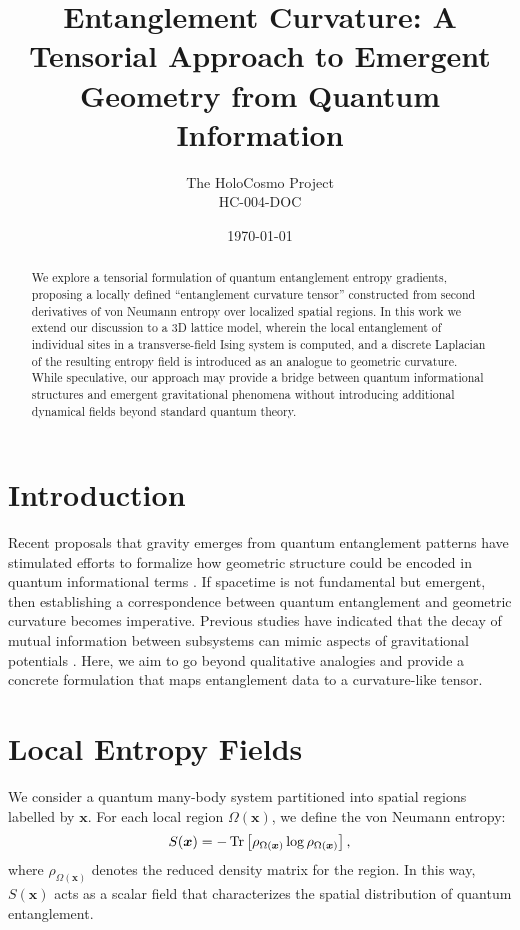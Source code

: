 \documentclass[12pt]{article}
\title{Entanglement Curvature: A Tensorial Approach to Emergent Geometry from Quantum Information}
\author{The HoloCosmo Project\\HC-004-DOC}
\date{\today}
\begin{document}
\maketitle

\begin{abstract}
We explore a tensorial formulation of quantum entanglement entropy gradients, proposing a locally defined ``entanglement curvature tensor'' constructed from second derivatives of von Neumann entropy over localized spatial regions. In this work we extend our discussion to a 3D lattice model, wherein the local entanglement of individual sites in a transverse-field Ising system is computed, and a discrete Laplacian of the resulting entropy field is introduced as an analogue to geometric curvature. While speculative, our approach may provide a bridge between quantum informational structures and emergent gravitational phenomena without introducing additional dynamical fields beyond standard quantum theory.
\end{abstract}

\section{Introduction}
Recent proposals that gravity emerges from quantum entanglement patterns have stimulated efforts to formalize how geometric structure could be encoded in quantum informational terms \cite{VanRaamsdonk2010,Swingle2012}. If spacetime is not fundamental but emergent, then establishing a correspondence between quantum entanglement and geometric curvature becomes imperative. Previous studies have indicated that the decay of mutual information between subsystems can mimic aspects of gravitational potentials \cite{HoloCosmoToy2025}. Here, we aim to go beyond qualitative analogies and provide a concrete formulation that maps entanglement data to a curvature-like tensor.

\section{Local Entropy Fields}
We consider a quantum many-body system partitioned into spatial regions labelled by $\bm{x}$. For each local region $\Omega(\bm{x})$, we define the von Neumann entropy:
\begin{equation}
  S(\bm{x}) = -\Tr\left[\rho_{\Omega(\bm{x})} \log \rho_{\Omega(\bm{x})}\right],
\end{equation}
where $\rho_{\Omega(\bm{x})}$ denotes the reduced density matrix for the region. In this way, $S(\bm{x})$ acts as a scalar field that characterizes the spatial distribution of quantum entanglement.
\end{document}
